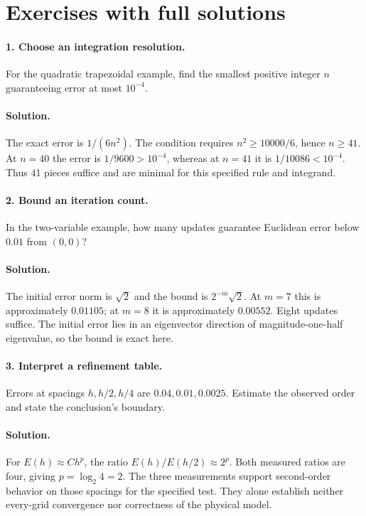 \section{Exercises with full solutions}
\paragraph{1. Choose an integration resolution.}
For the quadratic trapezoidal example, find the smallest positive integer
$n$ guaranteeing error at most $10^{-4}$.

\paragraph{Solution.}
The exact error is $1/(6n^2)$. The condition requires
$n^2\geq10000/6$, hence $n\geq41$. At $n=40$ the error is
$1/9600>10^{-4}$, whereas at $n=41$ it is $1/10086<10^{-4}$.
Thus 41 pieces suffice and are minimal for this specified rule and integrand.

\paragraph{2. Bound an iteration count.}
In the two-variable example, how many updates guarantee Euclidean error
below $0.01$ from $(0,0)$?

\paragraph{Solution.}
The initial error norm is $\sqrt2$ and the bound is $2^{-m}\sqrt2$.
At $m=7$ this is approximately $0.01105$; at $m=8$ it is approximately
$0.00552$. Eight updates suffice. The initial error lies in an eigenvector
direction of magnitude-one-half eigenvalue, so the bound is exact here.

\paragraph{3. Interpret a refinement table.}
Errors at spacings $h,h/2,h/4$ are $0.04,0.01,0.0025$. Estimate the
observed order and state the conclusion's boundary.

\paragraph{Solution.}
For $E(h)\approx Ch^p$, the ratio $E(h)/E(h/2)\approx2^p$.
Both measured ratios are four, giving $p=\log_2 4=2$.
The three measurements support second-order behavior on those spacings for
the specified test. They alone establish neither every-grid convergence
nor correctness of the physical model.


